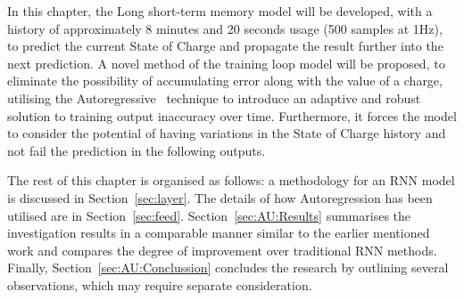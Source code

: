 %
%
In this chapter, the Long short-term memory model will be developed, with a history of approximately 8 minutes and 20 seconds usage (500 samples at 1Hz), to predict the current State of Charge and propagate the result further into the next prediction.
A novel method of the training loop model will be proposed, to eliminate the possibility of accumulating error along with the value of a charge, utilising the Autoregressive~\cite{time_2020} technique to introduce an adaptive and robust solution to training output inaccuracy over time.
Furthermore, it forces the model to consider the potential of having variations in the State of Charge history and not fail the prediction in the following outputs.


%
%

%
%
The rest of this chapter is organised as follows: a methodology for an RNN model is discussed in Section~\ref{sec:layer}.
The details of how Autoregression has been utilised are in Section~\ref{sec:feed}.
Section~\ref{sec:AU:Results} summarises the investigation results in a comparable manner similar to the earlier mentioned work and compares the degree of improvement over traditional RNN methods.
Finally, Section~\ref{sec:AU:Conclussion} concludes the research by outlining several observations, which may require separate consideration.
